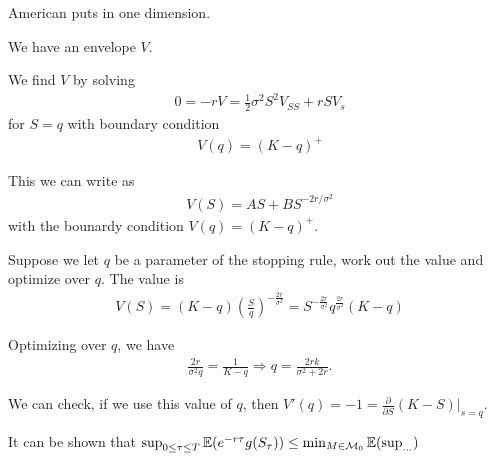 \begin{exmp}
  \label{defn:market_models:5}
  American puts in one dimension.

  We have an envelope $V$.

  We find $V$ by solving
  \begin{align}
    \label{eq:140}
    0 = -rV = \frac{1}{2} \sigma^{2} S^{2} V_{SS} + rSV_{s}
  \end{align} for $S = q$ with boundary condition
  \begin{align}
    \label{eq:141}
    V(q) = (K-q)^{+}
  \end{align}

  This we can write as
  \begin{align}
    \label{eq:142}
    V(S) = AS + BS^{-2r/\sigma^{2}}
  \end{align} with the bounardy condition $V(q) = (K - q)^{+}$.

  Suppose we let $q$ be a parameter of the stopping rule, work out the
  value and optimize over $q$. The value is
  \begin{align}
    \label{eq:143}
    V(S) = (K - q) (\frac{S}{q})^{-\frac{2r}{\sigma^{2}}} =
    S^{-\frac{2r}{\sigma^{2}}} q^{\frac{2r}{\sigma^{2}}}(K - q)
  \end{align}

  Optimizing over $q$, we have
  \begin{align}
    \label{eq:144}
    \frac{2r}{\sigma^{2} q} = \frac{1}{K-q} \Rightarrow q =
    \frac{2rk}{\sigma^{2} + 2r}.
  \end{align}

  We can check, if we use this value of $q$, then $V'(q) = -1 =
  \frac{\partial}{\partial S}(K - S)|_{s=q}$.

  It can be shown that $\sup_{0 \leq \tau \leq T} \E{e^{-r \tau}
    g(S_{\tau})} \leq \min_{M \in \mathcal{M}_{0}} \E{\sup_{...}}$ 
\end{exmp}





